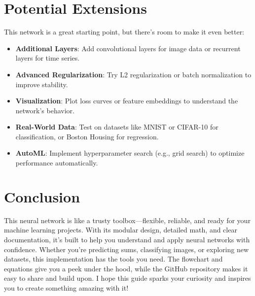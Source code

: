 \documentclass[11pt, a4paper]{article}
\begin{document}
\section{Potential Extensions}
This network is a great starting point, but there’s room to make it even better:
\begin{itemize}
    \item \textbf{Additional Layers}: Add convolutional layers for image data or recurrent layers for time series.
    \item \textbf{Advanced Regularization}: Try L2 regularization or batch normalization to improve stability.
    \item \textbf{Visualization}: Plot loss curves or feature embeddings to understand the network’s behavior.
    \item \textbf{Real-World Data}: Test on datasets like MNIST or CIFAR-10 for classification, or Boston Housing for regression.
    \item \textbf{AutoML}: Implement hyperparameter search (e.g., grid search) to optimize performance automatically.
\end{itemize}

\section{Conclusion}
This neural network is like a trusty toolbox—flexible, reliable, and ready for your machine learning projects. With its modular design, detailed math, and clear documentation, it’s built to help you understand and apply neural networks with confidence. Whether you’re predicting sums, classifying images, or exploring new datasets, this implementation has the tools you need. The flowchart and equations give you a peek under the hood, while the GitHub repository makes it easy to share and build upon. I hope this guide sparks your curiosity and inspires you to create something amazing with it!



\end{document}

